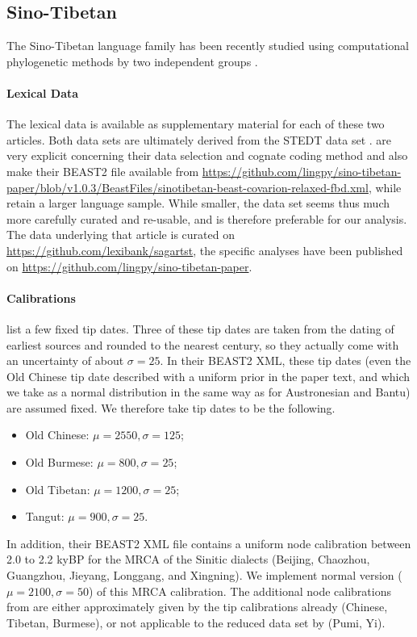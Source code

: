 \documentclass[]{rsos}%
\begin{document}
\subsection{Sino-Tibetan}\label{s:sinotibetan}
The Sino-Tibetan language family has been recently studied using computational phylogenetic methods by two independent groups
\parencite{sagart2019dated,zhang2019phylogenetic}.
\paragraph{Lexical Data}
The lexical data is available as supplementary material for each of these two
articles. Both data sets are ultimately derived from the STEDT data set
\parencite{stedt}.  are very explicit concerning their
data selection and cognate coding method and also make their BEAST2 file available from \url{https://github.com/lingpy/sino-tibetan-paper/blob/v1.0.3/BeastFiles/sinotibetan-beast-covarion-relaxed-fbd.xml}, while
 retain a larger language sample.
While smaller, the \textcite{sagart2019dated} data set seems thus much more carefully
curated and re-usable, and is therefore preferable for our analysis.
The data underlying that article is curated on \url{https://github.com/lexibank/sagartst}, the specific analyses have been published on \url{https://github.com/lingpy/sino-tibetan-paper}.

\paragraph{Calibrations}
\Textcite{sagart2019dated} list a few fixed tip dates. Three of these tip dates are taken from the dating of earliest sources and rounded to the nearest century, so they actually come with an uncertainty of about $\sigma=25$. In their BEAST2 XML, these tip dates (even the Old Chinese tip date described with a uniform prior in the paper text, and which we take as a normal distribution in the same way as for Austronesian and Bantu) are assumed fixed.
We therefore take tip dates to be the following.
\begin{itemize}
    \item Old Chinese: $\mu=2550, \sigma=125$;
    \item Old Burmese: $\mu=800, \sigma=25$;
    \item Old Tibetan: $\mu=1200, \sigma=25$;
    \item Tangut: $\mu=900, \sigma=25$.
\end{itemize}
In addition, their BEAST2 XML file contains a uniform node calibration between 2.0 to 2.2 kyBP for the MRCA of the Sinitic dialects (Beijing, Chaozhou, Guangzhou, Jieyang, Longgang, and Xingning). We implement normal version ($\mu=2100, \sigma=50$) of this MRCA calibration.
The additional node calibrations from \textcite{zhang2019phylogenetic} are either approximately given by the tip calibrations already (Chinese, Tibetan, Burmese), or not applicable to the reduced data set by \textcite{sagart2019dated} (Pumi, Yi).
\end{document}
